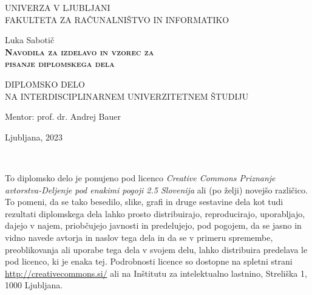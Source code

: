 \documentclass[12pt,a4paper,openany]{book}
\begin{document}
\thispagestyle{empty} 

\begin{center}
{\large 
UNIVERZA V LJUBLJANI\\
FAKULTETA ZA RAČUNALNIŠTVO IN INFORMATIKO\\
}

\vspace{3cm}
{\LARGE Luka Sabotič}\\

\vspace{2cm}
\textsc{\textbf{\LARGE 
Navodila za izdelavo in vzorec za\\ 
pisanje diplomskega dela\\ 
}}

\vspace{2cm}
{ DIPLOMSKO DELO}\\
{ NA INTERDISCIPLINARNEM UNIVERZITETNEM ŠTUDIJU\\
}

\vspace{2cm} 
{\Large Mentor: prof. dr. Andrej Bauer}

\vfill
{\Large Ljubljana, 2023}
\end{center}

\newpage

\ \thispagestyle{empty}

\newpage


\thispagestyle{empty}

\vspace*{5cm}
{\small \noindent
To diplomsko delo je ponujeno pod licenco \textit{Creative Commons Priznanje avtorstva-Deljenje pod enakimi pogoji 2.5 Slovenija}
ali (po želji) novejšo različico.
To pomeni, da se tako besedilo, slike, grafi in druge sestavine dela kot tudi rezultati diplomskega dela lahko prosto distribuirajo,
reproducirajo, uporabljajo, dajejo v najem, priobčujejo javnosti in predelujejo, pod pogojem, da se jasno in vidno navede avtorja in naslov tega
dela in da se v primeru spremembe, preoblikovanja ali uporabe tega dela v svojem delu, lahko distribuira predelava le pod
licenco, ki je enaka tej.
Podrobnosti licence so dostopne na spletni strani \url{http://creativecommons.si/} ali na Inštitutu za
intelektualno lastnino, Streliška 1, 1000 Ljubljana.

\begin{center}%
  \hspace*{1ex}
\end{center}
}
\end{document}
